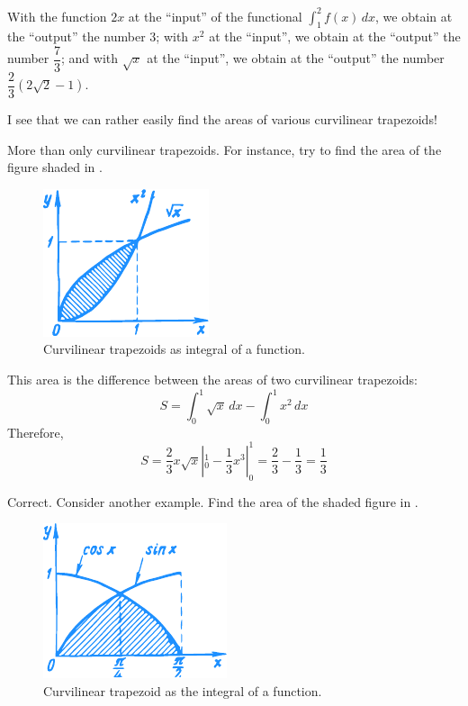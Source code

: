With the function $2x$ at the ``input'' of the functional $\int_{1}^{2} f(x) \, dx $, we obtain at the ``output'' the number 3; with $x^{2}$ at the ``input'', we obtain at the ``output'' the number $\dfrac{7}{3}$; and with $\sqrt{x}$ at the ``input'', we obtain at the ``output'' the number  $\dfrac{2}{3} (2 \sqrt{2} -1)$.

\rdr I see that we can rather easily find the areas of various curvilinear trapezoids!

\athr More than only curvilinear trapezoids. For instance, try to find the area of the figure shaded in . 

\begin{figure}[!ht]%
\centering
\includegraphics[width=.45\textwidth]{figures/fig-50.pdf} 
\caption{Curvilinear trapezoids as integral of a function.}
\label{fig-50}
\end{figure}

\rdr This area is the difference between the areas
of two curvilinear trapezoids: 
\begin{equation*}%
S = \int_{0}^{1} \sqrt{x} \, dx -  \int_{0}^{1} x^{2} \, dx
\end{equation*}
Therefore,
\begin{equation*}%
S = \dfrac{2}{3} x \sqrt{x} |_{0}^{1} -  \dfrac{1}{3} x^{3} |_{0}^{1} = \dfrac{2}{3} 	 - \dfrac{1}{3} = \dfrac{1}{3}
\end{equation*}

\athr Correct. Consider another example. Find the area of the shaded figure in	.

\begin{figure}[!ht]%
\centering
\includegraphics[width=.45\textwidth]{figures/fig-51.pdf}
\caption{Curvilinear trapezoid as the integral of a function.}
\label{fig-51}
\end{figure}


